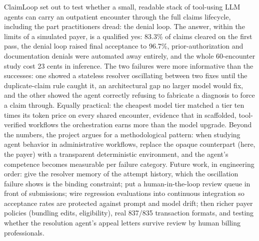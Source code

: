 \documentclass[sigconf,nonacm]{acmart}
\begin{document}
ClaimLoop set out to test whether a small, readable stack of tool-using LLM
agents can carry an outpatient encounter through the full claims lifecycle,
including the part practitioners dread: the denial loop. The answer, within
the limits of a simulated payer, is a qualified yes: 83.3\% of claims
cleared on the first pass, the denial loop raised final acceptance to
96.7\%, prior-authorization and documentation denials were automated away
entirely, and the whole 60-encounter study cost 23 cents in inference. The
two failures were more informative than the successes: one showed a
stateless resolver oscillating between two fixes until the duplicate-claim
rule caught it, an architectural gap no larger model would fix, and the
other showed the agent correctly refusing to fabricate a diagnosis to force
a claim through. Equally practical: the cheapest model tier matched a tier
ten times its token price on every shared encounter, evidence that in
scaffolded, tool-verified workflows the orchestration earns more than the
model upgrade.
Beyond the numbers, the project argues for a methodological pattern: when
studying agent behavior in administrative workflows, replace the opaque
counterpart (here, the payer) with a transparent deterministic environment,
and the agent's competence becomes measurable per failure category. Future
work, in engineering order: give the resolver memory of the attempt history,
which the oscillation failure shows is the binding constraint; put a
human-in-the-loop review queue in front of submissions; wire regression
evaluations into continuous integration so acceptance rates are protected
against prompt and model drift; then richer payer policies (bundling edits,
eligibility), real 837/835 transaction formats, and testing whether the
resolution agent's appeal letters survive review by human billing
professionals.



\end{document}
